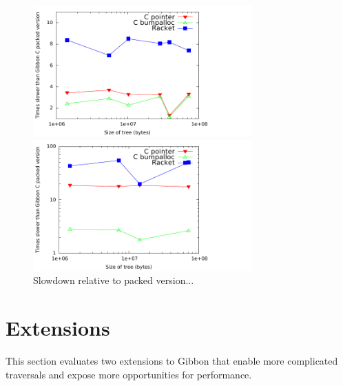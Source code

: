 \documentclass[a4paper,english]{lipics-v2016}
\newcommand{\treelang}{Gibbon\xspace} %
\begin{document}
\begin{figure}[t]
  \vspace{-2mm}
  \begin{minipage}{1.04\textwidth}
    \begin{minipage}{.49\textwidth}
      \centering
      \includegraphics[width=3.3in]{./figs/slowdown_countnodes.pdf}
    \end{minipage}
    \begin{minipage}{.49\textwidth}
      \includegraphics[width=3.3in]{./figs/slowdown_treewalk.pdf}
    \end{minipage}
  \end{minipage}
  \vspace{-4mm}
  \caption{Slowdown relative to packed version...}
  \label{fig:slowdown}
  \vspace{-4mm}
\end{figure}
      

\section{Extensions}
\label{sec:future}

This section evaluates two extensions to \treelang{} that enable more complicated traversals and expose more opportunities for performance.
\end{document}
